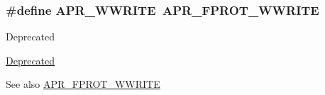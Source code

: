 \subsubsection[{\texorpdfstring{A\+P\+R\+\_\+\+W\+W\+R\+I\+TE}{APR_WWRITE}}]{\setlength{\rightskip}{0pt plus 5cm}\#define A\+P\+R\+\_\+\+W\+W\+R\+I\+TE~{\bf A\+P\+R\+\_\+\+F\+P\+R\+O\+T\+\_\+\+W\+W\+R\+I\+TE}}\hypertarget{group__apr__file__permissions_ga7aac61689e9aaa93176bdb4911f56863}{}\label{group__apr__file__permissions_ga7aac61689e9aaa93176bdb4911f56863}
\begin{DoxyRefDesc}{Deprecated}
\item[\hyperlink{deprecated__deprecated000020}{Deprecated}]\end{DoxyRefDesc}
\begin{DoxySeeAlso}{See also}
\hyperlink{group__apr__file__permissions_ga51692a9828f5b6288d89495378944260}{A\+P\+R\+\_\+\+F\+P\+R\+O\+T\+\_\+\+W\+W\+R\+I\+TE} 
\end{DoxySeeAlso}
